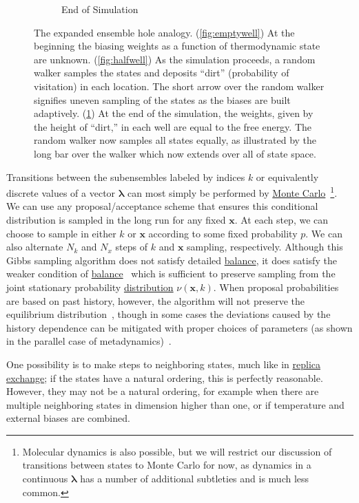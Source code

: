 \documentclass[9pt,review]{livecoms}
\newcommand{\vx}{\mathbf{x}}
\begin{document}
\begin{figure}[ht]
\begin{subfigure}[b]{0.33\textwidth}
\caption{End of Simulation}
\label{fig:fullwell}
\end{subfigure}
\caption{The expanded ensemble hole analogy. (\ref{fig:emptywell}) At the beginning the biasing weights as a function of thermodynamic state are unknown. (\ref{fig:halfwell}) As the simulation proceeds, a random walker samples the states and deposits ``dirt'' (probability of visitation) in each location.  The short arrow over the random walker signifies uneven sampling of the states as the biases are built adaptively.  (\ref{fig:fullwell}) At the end of the simulation, the weights, given by the height of ``dirt,'' in each well are equal to the free energy.  The random walker now samples all states equally, as illustrated by the long bar over the walker which now extends over all of state space.} \label{fig:EXEanalogy}
\end{figure}


Transitions between the subensembles labeled by indices $k$ or equivalently discrete values of a vector $\mathbf{\lambda}$ can most simply be performed by \hyperlink{ref:MetropolisMonteCarlo} {Monte Carlo}~\footnote{Molecular dynamics is also possible, but we will restrict our discussion of transitions
between states to Monte Carlo for now, as dynamics in a continuous $\mathbf{\lambda}$ has a number of additional subtleties and is much less common.}.  We can use any proposal/acceptance scheme that ensures this conditional distribution is sampled in the long run for any fixed $\vx$. At each step, we can choose to sample in either $k$ or $\vx$ according to some fixed probability $p$.  We can also alternate $N_k$ and $N_x$ steps of $k$ and $\vx$ sampling, respectively.  Although this Gibbs sampling algorithm does not satisfy detailed \hyperlink{ref:Balance} {balance}, it does satisfy the weaker condition of \hyperlink{ref:Balance} {balance}~\cite{deem:jcp:1999:balance} which is sufficient to preserve sampling from the joint stationary probability \hyperlink{ref:Distribution} {distribution}  $\nu(\vx,k)$.  When proposal probabilities are based on past history, however, the algorithm will not preserve the equilibrium distribution~\cite{reinhardt:cpl:2000:step-size-adjustment}, though in some cases the deviations caused by the history dependence can be mitigated with proper choices of parameters (as shown in the parallel case of metadynamics)~\cite{bussi.equilibriummetadynamics}.

One possibility is to make steps to neighboring states, much like in \hyperlink{ref:ReplEx} {replica exchange}; if the states have a natural ordering, this is perfectly reasonable. However, they may not be a natural ordering, for example when there are multiple neighboring states in dimension higher than one, or if temperature and external biases are combined.
\end{document}
